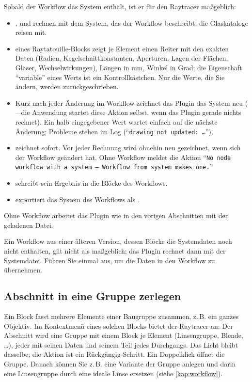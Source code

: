 Sobald der Workflow das System enthält, ist er für den Raytracer maßgeblich:
\begin{itemize}
  \item {},  und  rechnen mit dem System, das der
    Workflow beschreibt; die Glaskataloge reisen mit.
  \item {} eines Raytatouille-Blocks zeigt je Element einen Reiter mit den
    exakten Daten (Radien, Kegelschnittkonstanten, Aperturen, Lagen der Flächen, Gläser,
    Wechselwirkungen), Längen in mm, Winkel in Grad; die Eigenschaft \enquote{variable} eines
    Werts ist ein Kontrollkästchen. Nur die Werte, die Sie ändern, werden zurückgeschrieben.
  \item Kurz nach jeder Änderung im Workflow zeichnet das Plugin das System neu
    ( -- die Anwendung startet diese Aktion selbst, wenn das Plugin
    gerade nichts rechnet). Ein halb eingegebener Wert wartet einfach auf die nächste Änderung;
    Probleme stehen im Log (\enquote{\texttt{drawing not updated: …}}).
  \item {} zeichnet sofort. Vor jeder Rechnung wird ohnehin neu gezeichnet,
    wenn sich der Workflow geändert hat. Ohne Workflow meldet die Aktion \enquote{\texttt{No
    node workflow with a system – Workflow from system makes one.}}
  \item {} schreibt sein Ergebnis in die Blöcke des Workflows.
  \item {} exportiert das System des Workflows als .
\end{itemize}

Ohne Workflow arbeitet das Plugin wie in den vorigen Abschnitten mit der geladenen Datei.

\begin{hinweis}
Ein Workflow aus einer älteren Version, dessen Blöcke die Systemdaten noch nicht enthalten, gilt
nicht als maßgeblich; das Plugin rechnet dann mit der Systemdatei. Führen Sie einmal
 aus, um die Daten in den Workflow zu übernehmen.
\end{hinweis}

\subsection{Abschnitt in eine Gruppe zerlegen}

Ein Block  fasst mehrere Elemente einer Baugruppe zusammen, z.\,B. ein ganzes
Objektiv. Im Kontextmenü eines solchen Blocks bietet der Raytracer 
an: Der Abschnitt wird eine Gruppe mit einem Block je Element (Linsengruppe, Blende, \dots), jeder
mit seinen Daten und seinem Teil jedes Durchgangs. Das Licht bleibt dasselbe; die Aktion ist ein
Rückgängig-Schritt. Ein Doppelklick öffnet die Gruppe. Danach können Sie z.\,B. eine Variante der
Gruppe anlegen und darin eine Linsengruppe durch eine ideale Linse ersetzen (siehe
\autoref{kap:workflow}).

